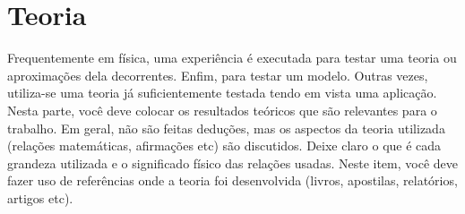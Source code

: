 
\newpage

\section{Teoria}
Frequentemente em física, uma experiência é executada para testar uma teoria ou aproximações dela decorrentes. Enfim, para testar um modelo. Outras vezes, utiliza-se uma teoria já suficientemente testada tendo em vista uma aplicação. Nesta parte, você deve colocar os resultados teóricos que são relevantes para o trabalho. Em geral, não são feitas deduções, mas os aspectos da teoria utilizada (relações matemáticas, afirmações etc) são discutidos. Deixe claro o que é cada grandeza utilizada e o significado físico das relações usadas. Neste item, você deve fazer uso de referências onde a teoria foi desenvolvida (livros, apostilas, relatórios, artigos etc).